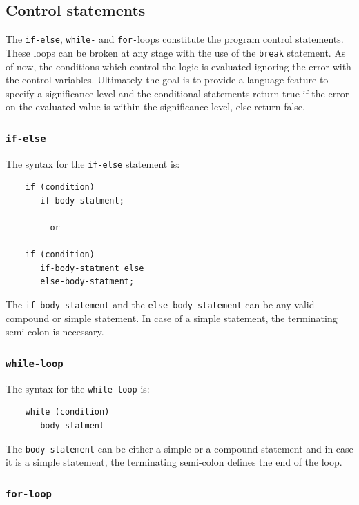 \documentclass[12pt]{article}
\begin{document}
\subsection{Control statements}

The {\tt if-else}, {\tt while-} and {\tt for-}loops constitute the
program control statements.  These loops can be broken at any stage
with the use of the {\tt break} statement.  As of now, the conditions
which control the logic is evaluated ignoring the error with the
control variables.  Ultimately the goal is to provide a language
feature to specify a significance level and the conditional statements
return true if the error on the evaluated value is within the
significance level, else return false.

\subsubsection{{\tt if-else}}

The syntax for the {\tt if-else} statement is:
\begin{verbatim}
    if (condition)
       if-body-statment;

         or

    if (condition)
       if-body-statment else
       else-body-statment;
\end{verbatim}
The {\tt if-body-statement} and the {\tt else-body-statement} can be
any valid compound or simple statement.  In case of a simple
statement, the terminating semi-colon is necessary.

\subsubsection{{\tt while-loop}}

The syntax for the {\tt while-loop} is:
\begin{verbatim}
    while (condition)
       body-statment
\end{verbatim}
The {\tt body-statement} can be either a simple or a compound
statement and in case it is a simple statement, the terminating
semi-colon defines the end of the loop.

\subsubsection{{\tt for-loop}}
\end{document}
